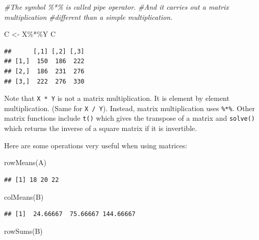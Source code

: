 \documentclass[
]{book}
\newenvironment{Shaded}{\begin{snugshade}}{\end{snugshade}}
\newcommand{\CommentTok}[1]{\textcolor[rgb]{0.56,0.35,0.01}{\textit{#1}}}
\newcommand{\FunctionTok}[1]{\textcolor[rgb]{0.00,0.00,0.00}{#1}}
\newcommand{\NormalTok}[1]{#1}
\newcommand{\OtherTok}[1]{\textcolor[rgb]{0.56,0.35,0.01}{#1}}
\newcommand{\SpecialCharTok}[1]{\textcolor[rgb]{0.00,0.00,0.00}{#1}}
\begin{document}
\begin{Shaded}
\begin{Highlighting}[]
\CommentTok{\#The symbol \%*\% is called pipe operator.}
\CommentTok{\#And it carries out a matrix multiplication}
\CommentTok{\#different than a simple multiplication.}

\NormalTok{C }\OtherTok{\textless{}{-}}\NormalTok{ X}\SpecialCharTok{\%*\%}\NormalTok{Y  }
\NormalTok{C}
\end{Highlighting}
\end{Shaded}

\begin{verbatim}
##      [,1] [,2] [,3]
## [1,]  150  186  222
## [2,]  186  231  276
## [3,]  222  276  330
\end{verbatim}

Note that \texttt{X\ *\ Y} is not a matrix multiplication. It is element by element multiplication. (Same for \texttt{X\ /\ Y}). Instead, matrix multiplication uses \texttt{\%*\%}. Other matrix functions include \texttt{t()} which gives the transpose of a matrix and \texttt{solve()} which returns the inverse of a square matrix if it is invertible.

Here are some operations very useful when using matrices:

\begin{Shaded}
\begin{Highlighting}[]
\FunctionTok{rowMeans}\NormalTok{(A)}
\end{Highlighting}
\end{Shaded}

\begin{verbatim}
## [1] 18 20 22
\end{verbatim}

\begin{Shaded}
\begin{Highlighting}[]
\FunctionTok{colMeans}\NormalTok{(B)}
\end{Highlighting}
\end{Shaded}

\begin{verbatim}
## [1]  24.66667  75.66667 144.66667
\end{verbatim}

\begin{Shaded}
\begin{Highlighting}[]
\FunctionTok{rowSums}\NormalTok{(B)}
\end{Highlighting}
\end{Shaded}
\end{document}
